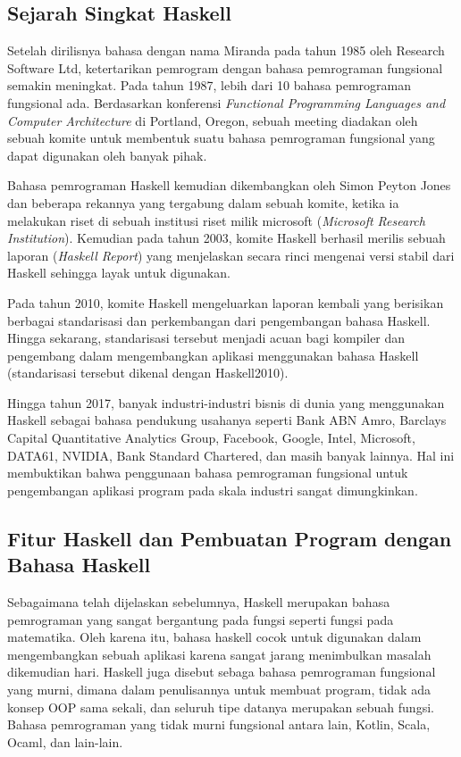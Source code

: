\documentclass[pi.tex]{subfile}
\begin{document}
\subsection{Sejarah Singkat Haskell}\hspace{5pt}
Setelah dirilisnya bahasa dengan nama Miranda pada tahun 1985 oleh Research Software Ltd, ketertarikan pemrogram dengan bahasa pemrograman fungsional semakin meningkat. Pada tahun 1987, lebih dari 10 bahasa pemrograman fungsional ada. Berdasarkan konferensi \emph{Functional Programming Languages and Computer Architecture} di Portland, Oregon, sebuah meeting diadakan oleh sebuah komite untuk membentuk suatu bahasa pemrograman fungsional yang dapat digunakan oleh banyak pihak.

\hspace{5pt}Bahasa pemrograman Haskell kemudian dikembangkan oleh Simon Peyton Jones dan beberapa rekannya yang tergabung dalam sebuah komite, ketika ia melakukan riset di sebuah institusi riset milik microsoft (\emph{Microsoft Research Institution}). Kemudian pada tahun 2003, komite Haskell berhasil merilis sebuah laporan (\emph{Haskell Report}) yang menjelaskan secara rinci mengenai versi stabil dari Haskell sehingga layak untuk digunakan.

\hspace{5pt}Pada tahun 2010, komite Haskell mengeluarkan laporan kembali yang berisikan berbagai standarisasi dan perkembangan dari pengembangan bahasa Haskell. Hingga sekarang, standarisasi tersebut menjadi acuan bagi kompiler dan pengembang dalam mengembangkan aplikasi menggunakan bahasa Haskell (standarisasi tersebut dikenal dengan Haskell2010).

\hspace{5pt}Hingga tahun 2017, banyak industri-industri bisnis di dunia yang menggunakan Haskell sebagai bahasa pendukung usahanya seperti Bank ABN Amro, Barclays Capital Quantitative Analytics Group, Facebook, Google, Intel, Microsoft, DATA61, NVIDIA, Bank Standard Chartered, dan masih banyak lainnya. Hal ini membuktikan bahwa penggunaan bahasa pemrograman fungsional untuk pengembangan aplikasi program pada skala industri sangat dimungkinkan.


\subsection{Fitur Haskell dan Pembuatan Program dengan Bahasa Haskell}\hspace{5pt}
Sebagaimana telah dijelaskan sebelumnya, Haskell merupakan bahasa pemrograman yang sangat bergantung pada fungsi seperti fungsi pada matematika. Oleh karena itu, bahasa haskell cocok untuk digunakan dalam mengembangkan sebuah aplikasi karena sangat jarang menimbulkan masalah dikemudian hari. Haskell juga disebut sebaga bahasa pemrograman fungsional yang murni, dimana dalam penulisannya untuk membuat program, tidak ada konsep OOP sama sekali, dan seluruh tipe datanya merupakan sebuah fungsi. Bahasa pemrograman yang tidak murni fungsional antara lain, Kotlin, Scala, Ocaml, dan lain-lain.
\end{document}
